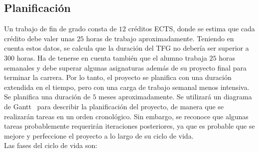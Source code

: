 \subsection{Planificación}
Un trabajo de fin de grado consta de $12$ créditos ECTS, donde se estima que cada crédito debe valer unas $25$ horas de trabajo aproximadamente. Teniendo en cuenta estos datos, se calcula que la duración del TFG no debería ser superior a $300$ horas. Ha de tenerse en cuenta también que el alumno trabaja $25$ horas semanales y debe superar algunas asignaturas además de su proyecto final para terminar la carrera. Por lo tanto, el proyecto se planifica con una duración extendida en el tiempo, pero con una carga de trabajo semanal menos intensiva.\\[6pt]
Se planifica una duración de $5$ meses aproximadamente. Se utilizará un diagrama de Gantt~\cite{Clark1922} para describir la planificación del proyecto, de manera que se realizarán tareas en un orden cronológico. Sin embargo, se reconoce que algunas tareas probablemente requerirán iteraciones posteriores, ya que es probable que se mejore y perfeccione el proyecto a lo largo de su ciclo de vida.\\[6pt]
Las fases del ciclo de vida son:
